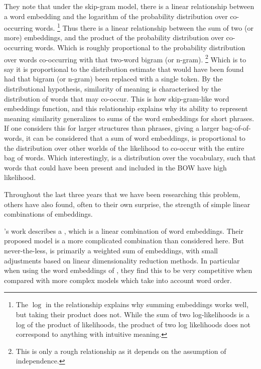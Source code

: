 \documentclass{book}
\begin{document}
They note that under the skip-gram model,
there is a linear relationship between a word embedding and the logarithm of the probability distribution over co-occurring words.%
\footnote{The $\log$ in the relationship explains why summing embeddings works well, but taking their product does not. While the sum of two log-likelihoods is a log of the product of likelihoods, the product of two log likelihoods does not correspond to anything with intuitive meaning.}
Thus there is a linear relationship between the sum of two (or more) embeddings,
and the product of the probability distribution over co-occurring words.
Which is roughly proportional to the probability distribution over words co-occurring with that two-word bigram (or n-gram).%
\footnote{This is only a rough relationship as it depends on the assumption of independence.}
Which is to say it is proportional to the distribution estimate that would have been found had that bigram (or n-gram) been replaced with a single token.
By the distributional hypothesis, similarity of meaning is characterised by the distribution of words that may co-occur.
This is how skip-gram-like word embeddings function, and this relationship explains why its ability to represent meaning similarity generalizes to sums of the word embeddings for short phrases.
If one considers this for larger structures than phrases, giving a larger bag-of-of-words,
it can be considered that a sum of word embeddings,
is proportional to the distribution over other worlds of the likelihood to co-occur with the entire bag of words.
Which interestingly, is a distribution over the vocabulary, such that words that could have been present and included in the BOW have high likelihood.








Throughout the last three years that we have been researching this problem,
others have also found, often to their own surprise,
the strength of simple linear combinations of embeddings.

\citet{arora2016simple}'s work describes a ,
which is a linear combination of word embeddings.
Their proposed model is a more complicated combination than considered here.
But never-the-less, is primarily a weighted sum of embeddings, with small adjustments based on linear dimensionality reduction methods.
In particular when using the word embeddings of \citet{wieting2015towards}, they find this to be very competitive when compared with more complex models which take into account word order.
\end{document}

